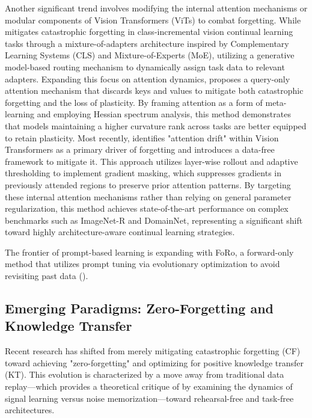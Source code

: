 \documentclass[11pt]{article}
\begin{document}
Another significant trend involves modifying the internal attention mechanisms or modular components of Vision Transformers (ViTs) to combat forgetting. While \citep{2404.07518} mitigates catastrophic forgetting in class-incremental vision continual learning tasks through a mixture-of-adapters architecture inspired by Complementary Learning Systems (CLS) and Mixture-of-Experts (MoE), utilizing a generative model-based routing mechanism to dynamically assign task data to relevant adapters. Expanding this focus on attention dynamics, \citep{2510.00365} proposes a query-only attention mechanism that discards keys and values to mitigate both catastrophic forgetting and the loss of plasticity. By framing attention as a form of meta-learning and employing Hessian spectrum analysis, this method demonstrates that models maintaining a higher curvature rank across tasks are better equipped to retain plasticity. Most recently, \citep{2602.05454} identifies "attention drift" within Vision Transformers as a primary driver of forgetting and introduces a data-free framework to mitigate it. This approach utilizes layer-wise rollout and adaptive thresholding to implement gradient masking, which suppresses gradients in previously attended regions to preserve prior attention patterns. By targeting these internal attention mechanisms rather than relying on general parameter regularization, this method achieves state-of-the-art performance on complex benchmarks such as ImageNet-R and DomainNet, representing a significant shift toward highly architecture-aware continual learning strategies.

The frontier of prompt-based learning is expanding with FoRo, a forward-only method that utilizes prompt tuning via evolutionary optimization to avoid revisiting past data (\citep{2509.01533}).
\subsection{Emerging Paradigms: Zero-Forgetting and Knowledge Transfer}

Recent research has shifted from merely mitigating catastrophic forgetting (CF) toward achieving "zero-forgetting" and optimizing for positive knowledge transfer (KT). This evolution is characterized by a move away from traditional data replay—which \citep{2602.02767} provides a theoretical critique of by examining the dynamics of signal learning versus noise memorization—toward rehearsal-free and task-free architectures.
\end{document}
